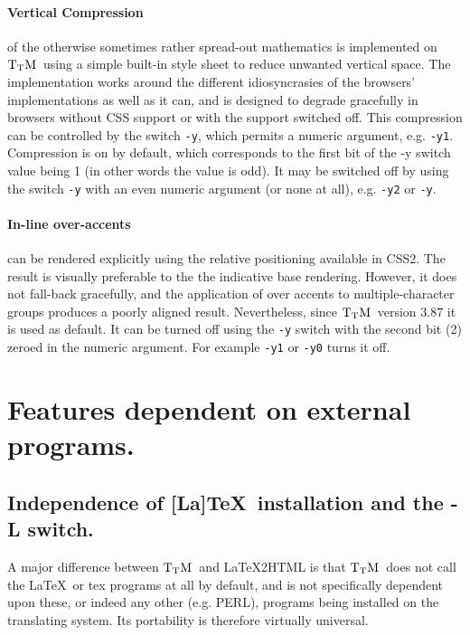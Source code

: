 \documentclass[12pt]{article}
\def\TtM{$\rm{}T_TH$}
\def\TtM{$\rm{}T_TM$}%
\begin{document}
\paragraph{Vertical Compression} of the otherwise sometimes rather
spread-out mathematics is implemented on \TtM\ using a simple built-in
style sheet to reduce unwanted vertical space. The implementation
works around the different idiosyncrasies of the browsers'
implementations as well as it can, and is designed to degrade
gracefully in browsers without CSS support or with the support
switched off. This compression can be controlled by the switch \verb!-y!,
which permits a numeric argument, e.g. \verb!-y1!.  Compression is on
by default, which corresponds to the first bit of the -y switch value
being 1 (in other words the value is odd).  It may be switched off by
using the switch \verb!-y! with an even numeric argument (or none at
all), e.g. \verb!-y2! or \verb!-y!.

\paragraph{In-line over-accents} can be rendered explicitly using the
relative positioning available in CSS2. The result is visually
 preferable to the the indicative base rendering. However, it does not
 fall-back gracefully, and the application of over accents to
 multiple-character groups produces a poorly aligned result.
  Nevertheless, since \TtM\ version 3.87 it is used as default. It can
 be turned off using the \verb!-y!  switch with the second bit (2) zeroed
 in the numeric argument. For example \verb!-y1! or \verb!-y0! turns
 it off.


\section{Features dependent on external programs.}

\subsection{Independence of [La]\TeX\ installation and the -L switch.}
\label{LaTeXfiles}
 A major difference
between \TtM\ and LaTeX2HTML is that \TtM\ does not call the \LaTeX\
or tex programs at all by default, and is not specifically dependent
upon these, or indeed any other (e.g. PERL), programs being installed
on the translating system. Its portability is therefore virtually
universal.
\end{document}
